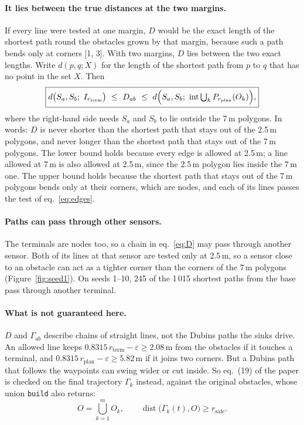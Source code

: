 \documentclass[10pt]{article}
\newcommand{\code}[1]{\texttt{#1}}
\newcommand{\rplan}{r_{\mathrm{plan}}}
\newcommand{\rsafe}{r_{\mathrm{safe}}}
\newcommand{\rterm}{r_{\mathrm{term}}}
\begin{document}
\paragraph{It lies between the true distances at the two margins.} If every line were tested at one margin, $D$ would be
the exact length of the shortest path round the obstacles grown by that margin, because such a path bends only at corners
[1, 3]. With two margins, $D$ lies between the two exact lengths. Write $d(p, q; X)$ for the length of the shortest path
from $p$ to $q$ that has no point in the set $X$. Then
\begin{equation}
  \boxed{d\bigl(S_a, S_b;\ I_{\rterm}\bigr) \ \le\ D_{ab} \ \le\
  d\Bigl(S_a, S_b;\ \operatorname{int} \textstyle\bigcup_k P_{\rplan}(O_k)\Bigr),}
  \label{eq:bounds}
\end{equation}
where the right-hand side needs $S_a$ and $S_b$ to lie outside the 7\,m polygons. In words: $D$ is never shorter than the
shortest path that stays out of the 2.5\,m polygons, and never longer than the shortest path that stays out of the 7\,m
polygons. The lower bound holds because every edge is allowed at 2.5\,m; a line allowed at 7\,m is also allowed at 2.5\,m,
since the 2.5\,m polygon lies inside the 7\,m one. The upper bound holds because the shortest path that stays out of the
7\,m polygons bends only at their corners, which are nodes, and each of its lines passes the test of
eq.~\eqref{eq:edges}.

\paragraph{Paths can pass through other sensors.} The terminals are nodes too, so a chain in eq.~\eqref{eq:D} may pass
through another sensor. Both of its lines at that sensor are tested only at 2.5\,m, so a sensor close to an obstacle can
act as a tighter corner than the corners of the 7\,m polygons (Figure~\ref{fig:seed1}). On seeds 1--10, 245 of the
1\,015 shortest paths from the base pass through another terminal.

\paragraph{What is not guaranteed here.} $D$ and $\Gamma_{ab}$ describe chains of straight lines, not the Dubins paths the
sinks drive. An allowed line keeps $0.8315\,\rterm - \varepsilon \ge 2.08$\,m from the obstacles if it touches a
terminal, and $0.8315\,\rplan - \varepsilon \ge 5.82$\,m if it joins two corners. But a Dubins path that follows the
waypoints can swing wider or cut inside. So eq.~(19) of the paper is checked on the final trajectory $\Gamma_k$ instead,
against the original obstacles, whose union \code{build} also returns:
\begin{equation}
  O = \bigcup_{k=1}^{m} O_k, \qquad \operatorname{dist}\bigl(\Gamma_k(t), O\bigr) \ge \rsafe .
  \label{eq:clearance}
\end{equation}
\end{document}
